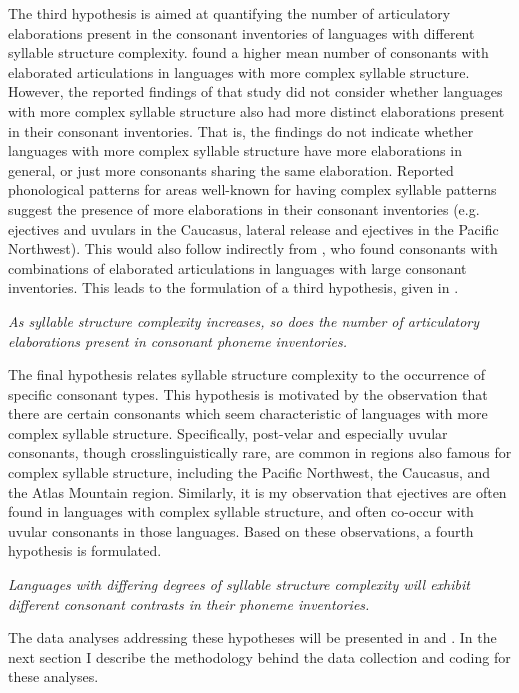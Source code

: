   The third hypothesis is aimed at quantifying the number of articulatory elaborations present in the consonant inventories of languages with different syllable structure complexity. \citet{MaddiesonEtAl2013} found a higher mean number of consonants with elaborated articulations in languages with more complex syllable structure. However, the reported findings of that study did not consider whether languages with more complex syllable structure also had more distinct elaborations present in their consonant inventories. That is, the findings do not indicate whether languages with more complex syllable structure have more elaborations in general, or just more consonants sharing the same elaboration. Reported phonological patterns for areas well-known for having complex syllable patterns suggest the presence of more elaborations in their consonant inventories (e.g. ejectives and uvulars in the Caucasus, lateral release and ejectives in the Pacific Northwest). This would also follow indirectly from \citet{LindblomMaddieson1988}, who found consonants with combinations of elaborated articulations in languages with large consonant inventories. This leads to the formulation of a third hypothesis, given in .

\ea\label{ex:4.4}
  \textit{As syllable structure complexity increases, so does the number of articulatory elaborations present in consonant phoneme inventories.}
\z

  The final hypothesis relates syllable structure complexity to the occurrence of specific consonant types. This hypothesis is motivated by the observation that there are certain consonants which seem characteristic of languages with more complex syllable structure. Specifically, post-velar and especially uvular consonants, though crosslinguistically rare, are common in regions also famous for complex syllable structure, including the Pacific Northwest, the Caucasus, and the Atlas Mountain region. Similarly, it is my observation that ejectives are often found in languages with complex syllable structure, and often co-occur with uvular consonants in those languages. Based on these observations, a fourth hypothesis is formulated.

\ea\label{ex:4.5}
  \textit{Languages with differing degrees of syllable structure complexity will exhibit different consonant contrasts in their phoneme inventories.}
\z

  The data analyses addressing these hypotheses will be presented in  and . In the next section I describe the methodology behind the data collection and coding for these analyses.

